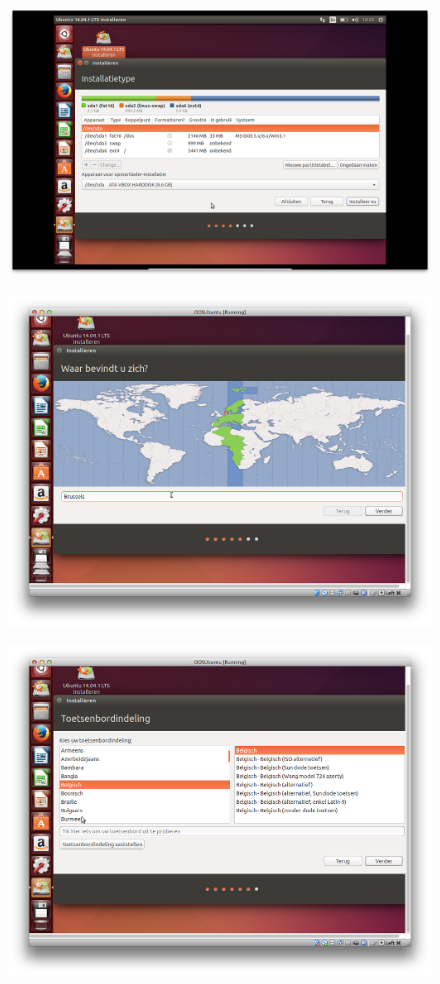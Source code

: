 \documentclass[11pt, a4paper]{article}
\begin{document}
\begin{figure}[H]
	\centering
	\includegraphics[width=\textwidth]{./IMG/N}
\end{figure}

\begin{figure}[H]
	\centering
	\includegraphics[width=\textwidth]{./IMG/O}
\end{figure}

\begin{figure}[H]
	\centering
	\includegraphics[width=\textwidth]{./IMG/P}
\end{figure}
\end{document}
